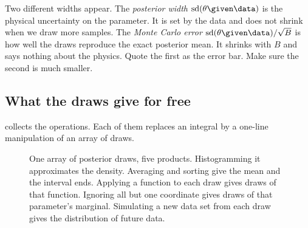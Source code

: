 \begin{pitfall}
Two different widths appear. The \emph{posterior width} $\text{sd}(\theta\given\data)$ is
the physical uncertainty on the parameter. It is set by the data and does not shrink when
we draw more samples. The \emph{Monte Carlo error} $\text{sd}(\theta\given\data)/\sqrt B$ is
how well the draws reproduce the exact posterior mean. It shrinks with $B$ and says nothing
about the physics. Quote the first as the error bar. Make sure the second is much smaller.
\end{pitfall}

\subsection{What the draws give for free}

 collects the operations. Each of them replaces an integral by a
one-line manipulation of an array of draws.

\begin{figure}[htbp]
\centering
{}
\caption{One array of posterior draws, five products. Histogramming it approximates the
density. Averaging and sorting give the mean and the interval ends. Applying a function
to each draw gives draws of that function. Ignoring all but one coordinate gives draws of
that parameter's marginal. Simulating a new data set from each draw gives the
distribution of future data.}
\label{5b:fig:draws-flow}
\end{figure}

